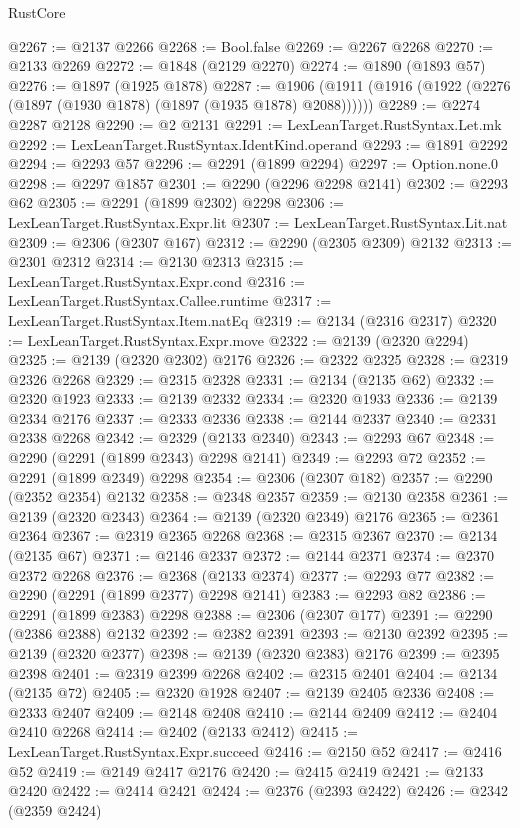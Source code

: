 \begin{lexlean}{RustCore}
\begin{coremodule}
@2267 := @2137 @2266
@2268 := Bool.false
@2269 := @2267 @2268
@2270 := @2133 @2269
@2272 := @1848 (@2129 @2270)
@2274 := @1890 (@1893 @57)
@2276 := @1897 (@1925 @1878)
@2287 := @1906 (@1911 (@1916 (@1922 (@2276 (@1897 (@1930 @1878) (@1897 (@1935 @1878) @2088))))))
@2289 := @2274 @2287 @2128
@2290 := @2 @2131
@2291 := LexLeanTarget.RustSyntax.Let.mk
@2292 := LexLeanTarget.RustSyntax.IdentKind.operand
@2293 := @1891 @2292
@2294 := @2293 @57
@2296 := @2291 (@1899 @2294)
@2297 := Option.none.{0}
@2298 := @2297 @1857
@2301 := @2290 (@2296 @2298 @2141)
@2302 := @2293 @62
@2305 := @2291 (@1899 @2302) @2298
@2306 := LexLeanTarget.RustSyntax.Expr.lit
@2307 := LexLeanTarget.RustSyntax.Lit.nat
@2309 := @2306 (@2307 @167)
@2312 := @2290 (@2305 @2309) @2132
@2313 := @2301 @2312
@2314 := @2130 @2313
@2315 := LexLeanTarget.RustSyntax.Expr.cond
@2316 := LexLeanTarget.RustSyntax.Callee.runtime
@2317 := LexLeanTarget.RustSyntax.Item.natEq
@2319 := @2134 (@2316 @2317)
@2320 := LexLeanTarget.RustSyntax.Expr.move
@2322 := @2139 (@2320 @2294)
@2325 := @2139 (@2320 @2302) @2176
@2326 := @2322 @2325
@2328 := @2319 @2326 @2268
@2329 := @2315 @2328
@2331 := @2134 (@2135 @62)
@2332 := @2320 @1923
@2333 := @2139 @2332
@2334 := @2320 @1933
@2336 := @2139 @2334 @2176
@2337 := @2333 @2336
@2338 := @2144 @2337
@2340 := @2331 @2338 @2268
@2342 := @2329 (@2133 @2340)
@2343 := @2293 @67
@2348 := @2290 (@2291 (@1899 @2343) @2298 @2141)
@2349 := @2293 @72
@2352 := @2291 (@1899 @2349) @2298
@2354 := @2306 (@2307 @182)
@2357 := @2290 (@2352 @2354) @2132
@2358 := @2348 @2357
@2359 := @2130 @2358
@2361 := @2139 (@2320 @2343)
@2364 := @2139 (@2320 @2349) @2176
@2365 := @2361 @2364
@2367 := @2319 @2365 @2268
@2368 := @2315 @2367
@2370 := @2134 (@2135 @67)
@2371 := @2146 @2337
@2372 := @2144 @2371
@2374 := @2370 @2372 @2268
@2376 := @2368 (@2133 @2374)
@2377 := @2293 @77
@2382 := @2290 (@2291 (@1899 @2377) @2298 @2141)
@2383 := @2293 @82
@2386 := @2291 (@1899 @2383) @2298
@2388 := @2306 (@2307 @177)
@2391 := @2290 (@2386 @2388) @2132
@2392 := @2382 @2391
@2393 := @2130 @2392
@2395 := @2139 (@2320 @2377)
@2398 := @2139 (@2320 @2383) @2176
@2399 := @2395 @2398
@2401 := @2319 @2399 @2268
@2402 := @2315 @2401
@2404 := @2134 (@2135 @72)
@2405 := @2320 @1928
@2407 := @2139 @2405 @2336
@2408 := @2333 @2407
@2409 := @2148 @2408
@2410 := @2144 @2409
@2412 := @2404 @2410 @2268
@2414 := @2402 (@2133 @2412)
@2415 := LexLeanTarget.RustSyntax.Expr.succeed
@2416 := @2150 @52
@2417 := @2416 @52
@2419 := @2149 @2417 @2176
@2420 := @2415 @2419
@2421 := @2133 @2420
@2422 := @2414 @2421
@2424 := @2376 (@2393 @2422)
@2426 := @2342 (@2359 @2424)

\end{coremodule}
\end{lexlean}
